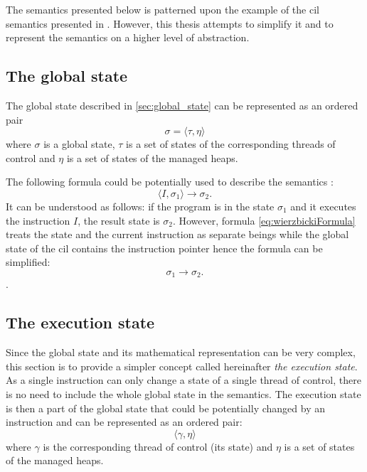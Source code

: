 \documentclass{article}
\numberwithin{equation}{section}
\begin{document}
The semantics presented below is patterned upon the example of the \acrshort{cil} semantics presented in \cite{zychlaThesis}. However, this thesis attempts to simplify it and to represent the semantics on a higher level of abstraction.

\subsection{The global state}

The global state described in \ref{sec:global_state} can be represented as an ordered pair
\begin{equation}
	\sigma = \langle\tau, \eta\rangle
\end{equation}
where $\sigma$ is a global state, $\tau$ is a set of states of the corresponding threads of control and $\eta$ is a set of states of the managed heaps.

The following formula could be potentially used to describe the semantics \cite{wierzbicki}:
\begin{equation}
\label{eq:wierzbickiFormula}
	\langle I, \sigma_1\rangle \rightarrow \sigma_2.
\end{equation}
It can be understood as follows: if the program is in the state $\sigma_1$ and it executes the instruction $I$, the result state is $\sigma_2$. However, formula \ref{eq:wierzbickiFormula} treats the state and the current instruction as separate beings while the global state of the \acrshort{cil} contains the instruction pointer hence the formula can be simplified:
\begin{equation}
\label{eq:wierzbickiFormula2}
	\sigma_1 \rightarrow \sigma_2.
\end{equation}.

\subsection{The execution state}
\label{sec:executionState}

Since the global state and its mathematical representation can be very complex, this section is to provide a simpler concept called hereinafter \textit{the execution state}. As a single instruction can only change a state of a single thread of control, there is no need to include the whole global state in the semantics. The execution state is then a part of the global state that could be potentially changed by an instruction and can be represented as an ordered pair:
\begin{equation}
\label{eq:executionState}
	\langle\gamma, \eta\rangle
\end{equation}
where $\gamma$ is the corresponding thread of control (its state) and $\eta$ is a set of states of the managed heaps.
\end{document}
